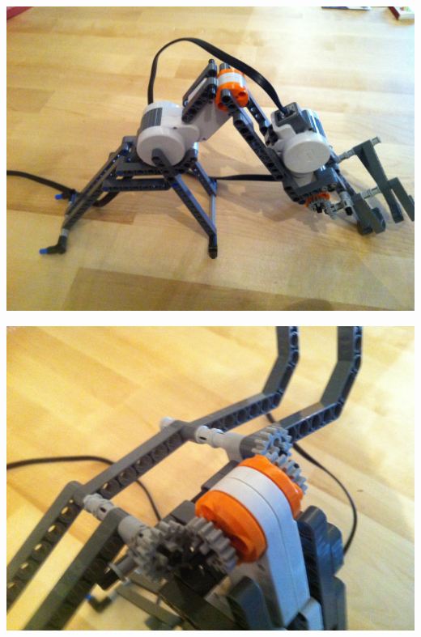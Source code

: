 \begin{capfigure}[Greifarm]
	\includegraphics[width=\textwidth]{images/construction/greifarm/Greifarm2}
\end{capfigure}

\begin{capfigure}
	\includegraphics[width=\textwidth]{images/construction/greifarm/Mechanik}
\end{capfigure}